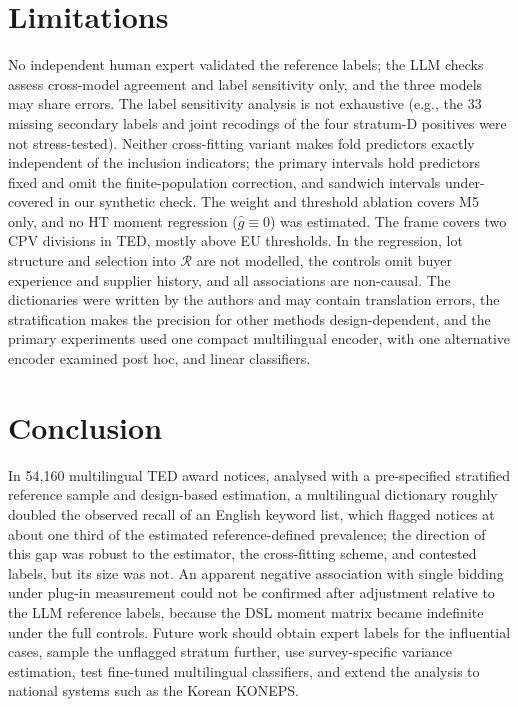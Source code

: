 \documentclass[runningheads]{llncs}
\begin{document}
\section{Limitations}
No independent human expert validated the reference labels; the LLM checks assess cross-model agreement and label sensitivity only, and the three models may share errors. The label sensitivity analysis is not exhaustive (e.g., the 33 missing secondary labels and joint recodings of the four stratum-D positives were not stress-tested). Neither cross-fitting variant makes fold predictors exactly independent of the inclusion indicators; the primary intervals hold predictors fixed and omit the finite-population correction, and sandwich intervals under-covered in our synthetic check. The weight and threshold ablation covers M5 only, and no HT moment regression ($\hat{g}\equiv0$) was estimated. The frame covers two CPV divisions in TED, mostly above EU thresholds. In the regression, lot structure and selection into $\mathcal{R}$ are not modelled, the controls omit buyer experience and supplier history, and all associations are non-causal. The dictionaries were written by the authors and may contain translation errors, the stratification makes the precision for other methods design-dependent, and the primary experiments used one compact multilingual encoder, with one alternative encoder examined post hoc, and linear classifiers.

\section{Conclusion}
In 54,160 multilingual TED award notices, analysed with a pre-specified stratified reference sample and design-based estimation, a multilingual dictionary roughly doubled the observed recall of an English keyword list, which flagged notices at about one third of the estimated reference-defined prevalence; the direction of this gap was robust to the estimator, the cross-fitting scheme, and contested labels, but its size was not. An apparent negative association with single bidding under plug-in measurement could not be confirmed after adjustment relative to the LLM reference labels, because the DSL moment matrix became indefinite under the full controls. Future work should obtain expert labels for the influential cases, sample the unflagged stratum further, use survey-specific variance estimation, test fine-tuned multilingual classifiers, and extend the analysis to national systems such as the Korean KONEPS.
\end{document}
